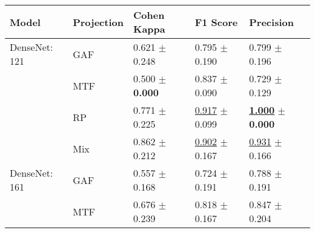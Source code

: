 
\begin{tabular}[t]{lllll}
\toprule
Model & Projection & Cohen Kappa & F1 Score & Precision \\
\midrule
DenseNet: 121 & GAF & \textcolor[rgb]{0.6608933455,0.3391066545,0}{0.621} $\pm$ \textcolor[rgb]{0.9041130657,0.0958869343,0}{0.248} & \textcolor[rgb]{0.6082844097,0.3917155903,0}{0.795} $\pm$ \textcolor[rgb]{0.8643144405,0.1356855595,0}{0.190} & \textcolor[rgb]{0.6744186047,0.3255813953,0}{0.799} $\pm$ \textcolor[rgb]{0.5590408937,0.4409591063,0}{0.196} \\
 & MTF & \textcolor[rgb]{0.9525979945,0.0474020055,0}{0.500} $\pm$ \textbf{\textcolor[rgb]{0.0000000000,0.5000000000,0}{0.000}} & \textcolor[rgb]{0.4337899543,0.5000000000,0}{0.837} $\pm$ \textcolor[rgb]{0.2073760791,0.5000000000,0}{0.090} & \textcolor[rgb]{0.9069767442,0.0930232558,0}{0.729} $\pm$ \textcolor[rgb]{0.3669781154,0.5000000000,0}{0.129} \\
 & RP & \textcolor[rgb]{0.3008204193,0.5000000000,0}{0.771} $\pm$ \textcolor[rgb]{0.8198234888,0.1801765112,0}{0.225} & \underline{\textcolor[rgb]{0.1043705153,0.5000000000,0}{0.917}} $\pm$ \textcolor[rgb]{0.2718715508,0.5000000000,0}{0.099} & \underline{\textbf{\textcolor[rgb]{0.0000000000,0.5000000000,0}{1.000}}} $\pm$ \textbf{\textcolor[rgb]{0.0000000000,0.5000000000,0}{0.000}} \\
 & Mix & \textcolor[rgb]{0.0802187785,0.5000000000,0}{0.862} $\pm$ \textcolor[rgb]{0.7731356242,0.2268643758,0}{0.212} & \underline{\textcolor[rgb]{0.1679712981,0.5000000000,0}{0.902}} $\pm$ \textcolor[rgb]{0.7127121360,0.2872878640,0}{0.167} & \underline{\textcolor[rgb]{0.2325581395,0.5000000000,0}{0.931}} $\pm$ \textcolor[rgb]{0.4733152883,0.5000000000,0}{0.166} \\
DenseNet: 161 & GAF & \textcolor[rgb]{0.8155575813,0.1844424187,0}{0.557} $\pm$ \textcolor[rgb]{0.6127939876,0.3872060124,0}{0.168} & \textcolor[rgb]{0.9001956947,0.0998043053,0}{0.724} $\pm$ \textcolor[rgb]{0.8705294077,0.1294705923,0}{0.191} & \textcolor[rgb]{0.7103594080,0.2896405920,0}{0.788} $\pm$ \textcolor[rgb]{0.5454934107,0.4545065893,0}{0.191} \\
 & MTF & \textcolor[rgb]{0.5296262534,0.4703737466,0}{0.676} $\pm$ \textcolor[rgb]{0.8718566415,0.1281433585,0}{0.239} & \textcolor[rgb]{0.5136986301,0.4863013699,0}{0.818} $\pm$ \textcolor[rgb]{0.7123620115,0.2876379885,0}{0.167} & \textcolor[rgb]{0.5116279070,0.4883720930,0}{0.847} $\pm$ \textcolor[rgb]{0.5804275230,0.4195724770,0}{0.204} \\

\end{tabular}
